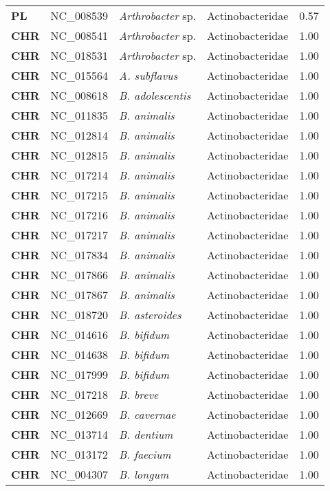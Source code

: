 \begin{adjustwidth}{-3cm}{2cm}
{\begin{supertabular}{>{\bfseries}l|p{0.1\textwidth}p{0.14\textwidth}l|l}
PL & NC\_008539 & \textit{Arthrobacter} sp. & Actinobacteridae & 0.57\\
CHR & NC\_008541 & \textit{Arthrobacter} sp. & Actinobacteridae & 1.00\\
CHR & NC\_018531 & \textit{Arthrobacter} sp. & Actinobacteridae & 1.00\\
CHR & NC\_015564 & \textit{A. subflavus} & Actinobacteridae & 1.00\\
CHR & NC\_008618 & \textit{B. adolescentis} & Actinobacteridae & 1.00\\
CHR & NC\_011835 & \textit{B. animalis} & Actinobacteridae & 1.00\\
CHR & NC\_012814 & \textit{B. animalis} & Actinobacteridae & 1.00\\
CHR & NC\_012815 & \textit{B. animalis} & Actinobacteridae & 1.00\\
CHR & NC\_017214 & \textit{B. animalis} & Actinobacteridae & 1.00\\
CHR & NC\_017215 & \textit{B. animalis} & Actinobacteridae & 1.00\\
CHR & NC\_017216 & \textit{B. animalis} & Actinobacteridae & 1.00\\
CHR & NC\_017217 & \textit{B. animalis} & Actinobacteridae & 1.00\\
CHR & NC\_017834 & \textit{B. animalis} & Actinobacteridae & 1.00\\
CHR & NC\_017866 & \textit{B. animalis} & Actinobacteridae & 1.00\\
CHR & NC\_017867 & \textit{B. animalis} & Actinobacteridae & 1.00\\
CHR & NC\_018720 & \textit{B. asteroides} & Actinobacteridae & 1.00\\
CHR & NC\_014616 & \textit{B. bifidum} & Actinobacteridae & 1.00\\
CHR & NC\_014638 & \textit{B. bifidum} & Actinobacteridae & 1.00\\
CHR & NC\_017999 & \textit{B. bifidum} & Actinobacteridae & 1.00\\
CHR & NC\_017218 & \textit{B. breve} & Actinobacteridae & 1.00\\
CHR & NC\_012669 & \textit{B. cavernae} & Actinobacteridae & 1.00\\
CHR & NC\_013714 & \textit{B. dentium} & Actinobacteridae & 1.00\\
CHR & NC\_013172 & \textit{B. faecium} & Actinobacteridae & 1.00\\
CHR & NC\_004307 & \textit{B. longum} & Actinobacteridae & 1.00\\

\end{supertabular}}
\end{adjustwidth}
